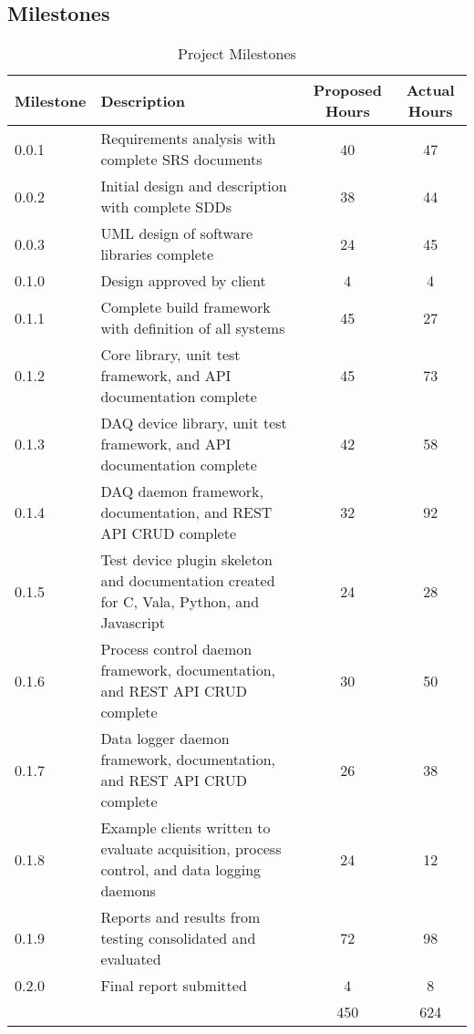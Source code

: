   \subsection{Milestones}\label{sec:timeline-milestones}

    \begin{table}[H]
      \centering
      \begin{tabular}{l p{10cm} c c}
        \toprule
        Milestone & Description & Proposed Hours & Actual Hours \\ [0.5ex]
        \midrule
        0.0.1 & Requirements analysis with complete SRS documents                                           & 40 & 47 \\
        0.0.2 & Initial design and description with complete SDDs                                           & 38 & 44 \\
        0.0.3 & UML design of software libraries complete                                                   & 24 & 45 \\
        0.1.0 & Design approved by client                                                                   & 4  &  4 \\
        0.1.1 & Complete build framework with definition of all systems                                     & 45 & 27 \\
        0.1.2 & Core library, unit test framework, and API documentation complete                           & 45 & 73 \\
        0.1.3 & DAQ device library, unit test framework, and API documentation complete                     & 42 & 58 \\
        0.1.4 & DAQ daemon framework, documentation, and REST API CRUD complete                             & 32 & 92 \\
        0.1.5 & Test device plugin skeleton and documentation created for C, Vala, Python, and Javascript   & 24 & 28 \\
        0.1.6 & Process control daemon framework, documentation, and REST API CRUD complete                 & 30 & 50 \\
        0.1.7 & Data logger daemon framework, documentation, and REST API CRUD complete                     & 26 & 38 \\
        0.1.8 & Example clients written to evaluate acquisition, process control, and data logging daemons  & 24 & 12 \\
        0.1.9 & Reports and results from testing consolidated and evaluated                                 & 72 & 98 \\
        0.2.0 & Final report submitted                                                                      & 4  &  8 \\
        \midrule
          & & 450 & 624 \\
        \bottomrule
      \end{tabular}
      \caption{Project Milestones}\label{tab:milestones}
    \end{table}
